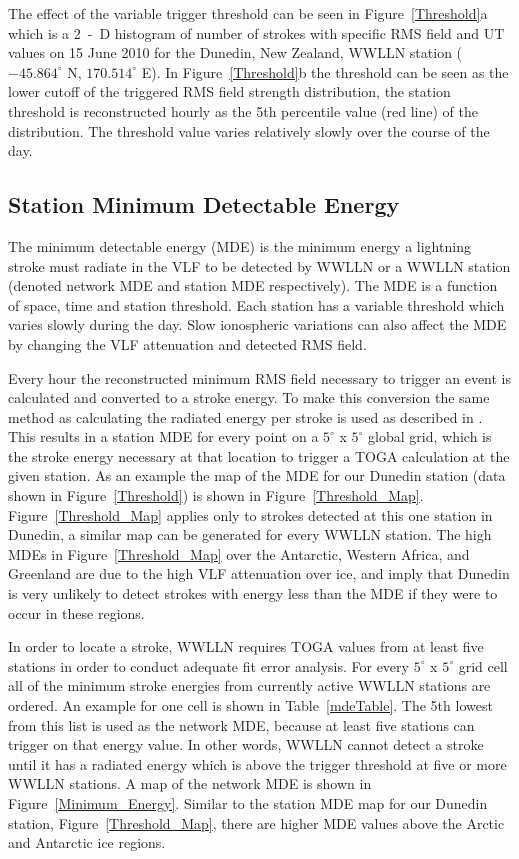 \documentclass[draft,ras]{agutex}
\begin{document}
\begin{article}
The effect of the variable trigger threshold can be seen in Figure~\ref{Threshold}a which is a 2~-~D histogram of number of strokes with specific RMS field and UT values on 15 June 2010 for the Dunedin, New Zealand, WWLLN station ($-45.864^\circ$ N, $170.514^\circ$ E). In Figure~\ref{Threshold}b the threshold can be seen as the lower cutoff of the triggered RMS field strength distribution, the station threshold is reconstructed hourly as the 5th percentile value (red line) of the distribution. The threshold value varies relatively slowly over the course of the day. 

\subsection{Station Minimum Detectable Energy}

The minimum detectable energy (MDE) is the minimum energy a lightning stroke must radiate in the VLF to be detected by WWLLN or a WWLLN station (denoted network MDE and station MDE respectively). The MDE is a function of space, time and station threshold. Each station has a variable threshold which varies slowly during the day. Slow ionospheric variations can also affect the MDE by changing the VLF attenuation and detected RMS field. 

Every hour the reconstructed minimum RMS field necessary to trigger an event is calculated and converted to a stroke energy. To make this conversion the same method as calculating the radiated energy per stroke is used as described in \citet{Hutchins2012}. This results in a station MDE for every point on a $5^\circ$ x $5^\circ$ global grid, which is the stroke energy necessary at that location to trigger a TOGA calculation at the given station. As an example the map of the MDE for our Dunedin station (data shown in Figure~\ref{Threshold}) is shown in Figure~\ref{Threshold_Map}. Figure~\ref{Threshold_Map} applies only to strokes detected at this one station in Dunedin, a similar map can be generated for every WWLLN station. The high MDEs in Figure~\ref{Threshold_Map} over the Antarctic, Western Africa, and Greenland are due to the high VLF attenuation over ice, and imply that Dunedin is very unlikely to detect strokes with energy less than the MDE if they were to occur in these regions.

In order to locate a stroke, WWLLN requires TOGA values from at least five stations in order to conduct adequate fit error analysis. For every $5^\circ$ x $5^\circ$ grid cell all of the minimum stroke energies from currently active WWLLN stations are ordered. An example for one cell is shown in Table~\ref{mdeTable}. The 5th lowest from this list is used as the network MDE, because at least five stations can trigger on that energy value. In other words, WWLLN cannot detect a stroke until it has a radiated energy which is above the trigger threshold at five or more WWLLN stations. A map of the network MDE is shown in Figure~\ref{Minimum_Energy}. Similar to the station MDE map for our Dunedin station, Figure~\ref{Threshold_Map}, there are higher MDE values above the Arctic and Antarctic ice regions.


\end{article}
\end{document}
